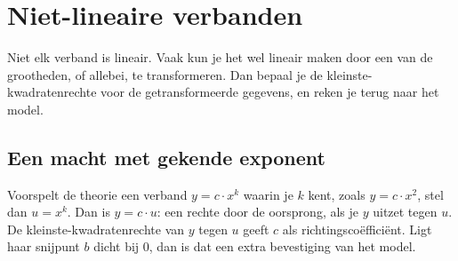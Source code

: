 \begin{oefeningen}
\end{oefeningen}

\section{Niet-lineaire verbanden}

Niet elk verband is lineair. Vaak kun je het wel lineair maken door een van de grootheden, of allebei, te transformeren. Dan bepaal je de kleinste-kwadratenrechte voor de getransformeerde gegevens, en reken je terug naar het model.

\subsection{Een macht met gekende exponent}

Voorspelt de theorie een verband $y = c \cdot x^k$ waarin je $k$ kent, zoals $y = c \cdot x^2$, stel dan $u = x^k$. Dan is $y = c \cdot u$: een rechte door de oorsprong, als je $y$ uitzet tegen $u$. De kleinste-kwadratenrechte van $y$ tegen $u$ geeft $c$ als richtingscoëfficiënt. Ligt haar snijpunt $b$ dicht bij $0$, dan is dat een extra bevestiging van het model.

